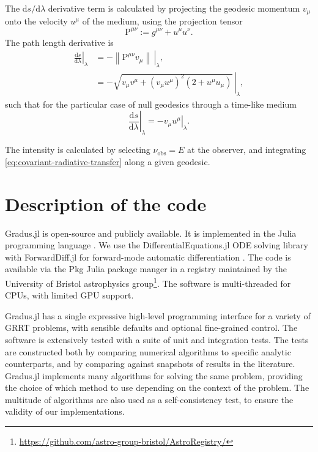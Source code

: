 \documentclass[fleqn,usenatbib]{mnras}
\newcommand{\software}[1]{{\sc #1}}
\newcommand{\Gradus}{\software{Gradus.jl}\xspace}
\renewcommand{\d}{\text{d}}
\begin{document}
The $\d s / \d \lambda$ derivative term is calculated by projecting the geodesic
momentum $v_\mu$ onto the velocity $u^\mu$ of the medium, using the projection
tensor
\begin{equation}
    \mathrm{P}^{\mu\nu} := g^{\mu\nu} + u^\mu u^\nu.
\end{equation}
The path length derivative is
\begin{align}
    \left. \frac{\d s}{\d \lambda} \right\rvert_\lambda
    &= - \left. \left\lVert \mathrm{P}^{\mu\nu} v_\mu\right\rVert\, \right\rvert_\lambda,\\
    &= - \left. \sqrt{v_\mu v^\mu + \left(v_\mu u^\mu\right)^2 \left(2 + u^\mu u_\mu\right)} \, \right\rvert_\lambda,
\end{align}
such that for the particular case of null geodesics through a time-like medium
\begin{equation}
    \left. \frac{\d s}{\d \lambda} \right\rvert_\lambda = - \left. v_\mu u^\mu \right\rvert_\lambda.
\end{equation}

The intensity is calculated by selecting $\nu_\text{obs} = E$ at the observer,
and integrating \eqref{eq:covariant-radiative-transfer} along a given geodesic.

\section{Description of the code}
\label{sec:description-of-code}

\Gradus is open-source and publicly available. It is implemented in the Julia
programming language \citep{Bezanson_Julia_A_fresh_2017}. We use the
DifferentialEquations.jl ODE solving library with ForwardDiff.jl for
forward-mode automatic differentiation \citep{RevelsLubinPapamarkou2016}. The
code is available via the \software{Pkg} Julia package manger in a registry
maintained by the University of Bristol astrophysics
group\footnote{\url{https://github.com/astro-group-bristol/AstroRegistry/}}. The
software is multi-threaded for CPUs, with limited GPU support.

\Gradus has a single expressive high-level programming interface for a variety
of GRRT problems, with sensible defaults and optional fine-grained control. The
software is extensively tested with a suite of unit and integration tests. The
tests are constructed both by comparing numerical algorithms to specific
analytic counterparts, and by comparing against snapshots of results in the
literature. \Gradus implements many algorithms for solving the same problem,
providing the choice of which method to use depending on the context of the
problem. The multitude of algorithms are also used as a self-consistency test,
to ensure the validity of our implementations.
\end{document}
